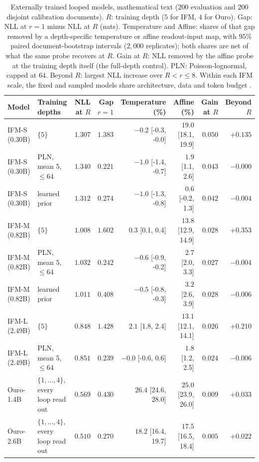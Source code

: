 \begin{table}[t]
\centering
\footnotesize\setlength{\tabcolsep}{3pt}
\begin{tabular}{llrrrrrr}
\toprule
Model & Training depths & NLL at $R$ & Gap $r{=}1$ & Temperature (\%) & Affine (\%) & Gain at $R$ & Beyond $R$ \\
\midrule
IFM-S (0.30B) & $\{5\}$ & $1.307$ & $1.383$ & $-0.2$ {\tiny[-0.3, -0.0]} & $19.0$ {\tiny[18.1, 19.9]} & $0.050$ & $+0.135$ \\
IFM-S (0.30B) & PLN, mean $5$, $\le 64$ & $1.340$ & $0.221$ & $-1.0$ {\tiny[-1.4, -0.7]} & $1.9$ {\tiny[1.1, 2.6]} & $0.043$ & $-0.000$ \\
IFM-S (0.30B) & learned prior & $1.312$ & $0.274$ & $-1.0$ {\tiny[-1.3, -0.8]} & $0.6$ {\tiny[-0.2, 1.3]} & $0.042$ & $-0.004$ \\
IFM-M (0.82B) & $\{5\}$ & $1.008$ & $1.602$ & $0.3$ {\tiny[0.1, 0.4]} & $13.8$ {\tiny[12.9, 14.9]} & $0.028$ & $+0.353$ \\
IFM-M (0.82B) & PLN, mean $5$, $\le 64$ & $1.032$ & $0.242$ & $-0.6$ {\tiny[-0.9, -0.2]} & $2.7$ {\tiny[2.0, 3.3]} & $0.027$ & $-0.004$ \\
IFM-M (0.82B) & learned prior & $1.011$ & $0.408$ & $-0.5$ {\tiny[-0.8, -0.3]} & $3.2$ {\tiny[2.6, 3.9]} & $0.028$ & $-0.006$ \\
IFM-L (2.49B) & $\{5\}$ & $0.848$ & $1.428$ & $2.1$ {\tiny[1.8, 2.4]} & $13.1$ {\tiny[12.1, 14.1]} & $0.026$ & $+0.210$ \\
IFM-L (2.49B) & PLN, mean $5$, $\le 64$ & $0.851$ & $0.239$ & $-0.0$ {\tiny[-0.6, 0.6]} & $1.8$ {\tiny[1.2, 2.5]} & $0.024$ & $-0.006$ \\
Ouro-1.4B & $\{1,\dots,4\}$, every loop read out & $0.569$ & $0.430$ & $26.4$ {\tiny[24.6, 28.0]} & $25.0$ {\tiny[23.9, 26.0]} & $0.009$ & $+0.033$ \\
Ouro-2.6B & $\{1,\dots,4\}$, every loop read out & $0.510$ & $0.270$ & $18.2$ {\tiny[16.4, 19.7]} & $17.5$ {\tiny[16.5, 18.4]} & $0.005$ & $+0.022$ \\
\bottomrule
\end{tabular}
\caption{Externally trained looped models, mathematical text ($200$ evaluation and $200$ disjoint calibration documents). $R$: training depth ($5$ for IFM, $4$ for Ouro). Gap: NLL at $r = 1$ minus NLL at $R$ (nats). Temperature and Affine: shares of that gap removed by a depth-specific temperature or affine readout-input map, with $95\%$ paired document-bootstrap intervals ($2{,}000$ replicates); both shares are net of what the same probe recovers at $R$. Gain at $R$: NLL removed by the affine probe at the training depth itself (the full-depth control). PLN: Poisson-lognormal, capped at $64$. Beyond $R$: largest NLL increase over $R < r \le 8$. Within each IFM scale, the fixed and sampled models share architecture, data and token budget \citep{huang2026fixedpoints}.}
\label{tab:looped}
\end{table}
